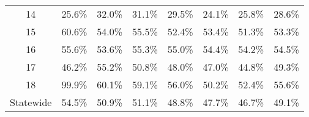 \begin{table}[!htbp]
\begin{tabular}{@{\extracolsep{-5pt}} cccccccc}
14 &  25.6\% & 32.0\% & 31.1\% & 29.5\% & 24.1\% & 25.8\% & 28.6\% \\ 
15 &  60.6\% & 54.0\% & 55.5\% & 52.4\% & 53.4\% & 51.3\% & 53.3\% \\ 
16 &  55.6\% & 53.6\% & 55.3\% & 55.0\% & 54.4\% & 54.2\% & 54.5\% \\ 
17 &  46.2\% & 55.2\% & 50.8\% & 48.0\% & 47.0\% & 44.8\% & 49.3\% \\ 
18 &  99.9\% & 60.1\% & 59.1\% & 56.0\% & 50.2\% & 52.4\% & 55.6\% \\ 
Statewide & 54.5\% & 50.9\% & 51.1\% & 48.8\% & 47.7\% & 46.7\% & 49.1\% \\ 
\end{tabular}
\end{table}
 
 

